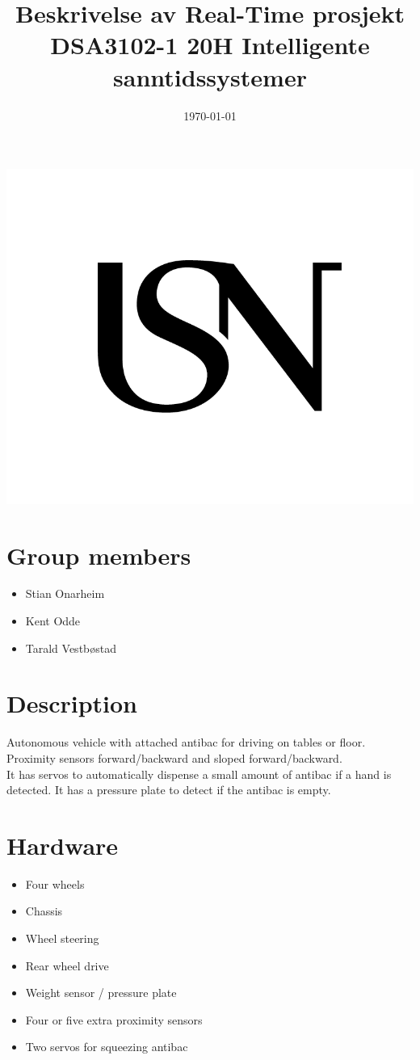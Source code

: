 \documentclass{article}
\title{Beskrivelse av Real-Time prosjekt \large\\
DSA3102-1 20H Intelligente sanntidssystemer}
\date{\today}
\begin{document}
\maketitle
\thispagestyle{empty}
\begin{center}
\includegraphics[width=\linewidth,height=0.2\textheight,keepaspectratio]{img/USN.png}
\end{center}


\newpage
\section{Group members}
	\begin{itemize}
		\item{Stian Onarheim}
		\item{Kent Odde}
		\item{Tarald Vestbøstad}
	\end{itemize}
\newpage
\section{Description}
	Autonomous vehicle with attached antibac for driving on tables or floor.\\
	Proximity sensors forward/backward and sloped forward/backward.\\
	It has servos to automatically dispense a small amount of antibac if a hand is detected. It has a pressure plate to detect if the antibac is empty.
\newpage
\section{Hardware}
	\begin{itemize}
		\item{Four wheels}
		\item{Chassis}
		\item{Wheel steering}
		\item{Rear wheel drive}
		\item{Weight sensor / pressure plate}
		\item{Four or five extra proximity sensors}
		\item{Two servos for squeezing antibac}
	\end{itemize}
\newpage
\end{document}
